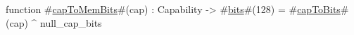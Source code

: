 function #\hyperref[sailMIPSzcapToMemBits]{capToMemBits}#(cap) : Capability -> #\hyperref[sailMIPSzbits]{bits}#(128) =
  #\hyperref[sailMIPSzcapToBits]{capToBits}#(cap) ^ null_cap_bits
